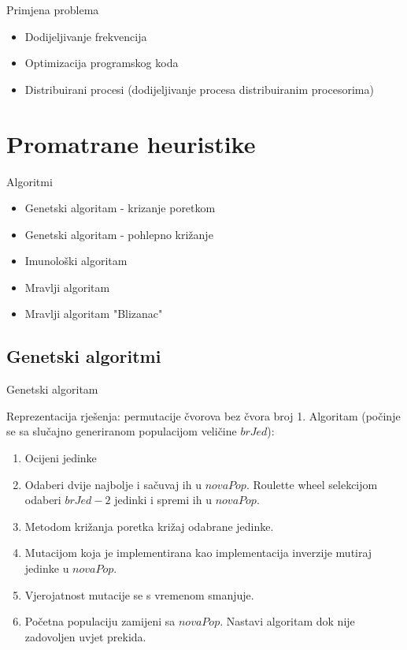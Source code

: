 \documentclass{beamer}
\begin{document}
\begin{frame}{Primjena problema}

\begin{itemize}
\item Dodijeljivanje frekvencija 
\item Optimizacija programskog koda
\item Distribuirani procesi (dodijeljivanje procesa distribuiranim procesorima)
\end{itemize}

\end{frame}

\section{Promatrane heuristike}
\begin{frame}{Algoritmi}

\begin{itemize}
\item Genetski algoritam - krizanje poretkom
\item Genetski algoritam - pohlepno kri\v{z}anje
\item Imunolo\v{s}ki algoritam
\item Mravlji algoritam 
\item Mravlji algoritam "Blizanac"

\end{itemize}

\end{frame}

\subsection{Genetski algoritmi}
\begin{frame}{Genetski algoritam}

Reprezentacija rje\v{s}enja: permutacije \v{c}vorova bez \v{c}vora broj 1.
Algoritam (po\v{c}inje se sa slu\v{c}ajno generiranom populacijom veli\v{c}ine $brJed$): \\
\begin{enumerate}
\item Ocijeni jedinke
\item Odaberi dvije najbolje i sa\v{c}uvaj ih u $novaPop$. Roulette wheel selekcijom odaberi $brJed - 2$ jedinki i spremi ih u $novaPop$.
\item Metodom kri\v{z}anja poretka kri\v{z}aj odabrane jedinke.
\item Mutacijom koja je implementirana kao implementacija inverzije mutiraj jedinke u $novaPop$.
\item Vjerojatnost mutacije se s vremenom smanjuje.
\item Po\v{c}etna populaciju zamijeni sa $novaPop$. Nastavi algoritam dok nije zadovoljen uvjet prekida.
\end{enumerate}

\end{frame}
\end{document}
